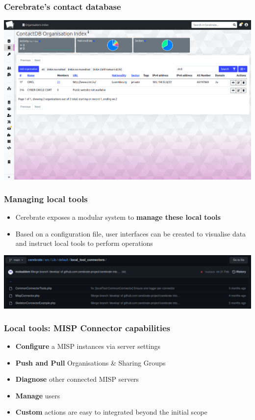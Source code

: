 \begin{frame}
\frametitle{Cerebrate's contact database}
    \begin{center}
        \includegraphics[width=0.99\linewidth]{pictures/contact-database-2.png}
    \end{center}
\end{frame}



\begin{frame}
\frametitle{Managing local tools}
    \begin{itemize}
        \item Cerebrate exposes a modular system to {\bf manage these local tools}
        \item Based on a configuration file, user interfaces can be created to visualise data and instruct local tools to perform operations
    \end{itemize}
    \begin{center}
        \includegraphics[width=1.0\linewidth]{pictures/github-local-tool.png}
    \end{center}
\end{frame}

\begin{frame}
\frametitle{Local tools: MISP Connector capabilities}
    \begin{itemize}
        \item \textbf{Configure} a MISP instances via server settings
        \item \textbf{Push and Pull} Organisations \& Sharing Groups
        \item \textbf{Diagnose} other connected MISP servers
        \item \textbf{Manage} users
        \item \textbf{Custom} actions are easy to integrated beyond the initial scope
    \end{itemize}
\end{frame}

